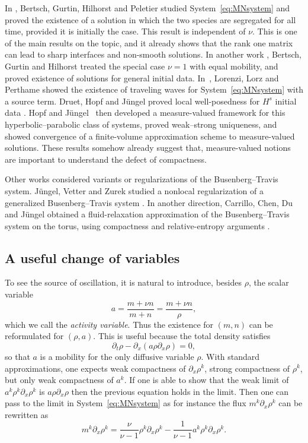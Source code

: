 \documentclass[a4paper,twosided,11pt]{article}
\newcommand{\1}{\mathbf{1}}
\theoremstyle{plain}
\theoremstyle{remark}
\numberwithin{equation}{section}
\begin{document}
In \cite{MR821681}, Bertsch, Gurtin, Hilhorst and Peletier studied System~\eqref{eq:MNsystem} and proved the existence of a solution in which the two species are segregated for all time, provided it is initially the case. This result is independent of $\nu$. This is one of the main results on the topic, and it already shows that the rank one matrix can lead to sharp interfaces and non-smooth solutions. In another work \cite{MR887658}, Bertsch, Gurtin and Hilhorst treated the special case $\nu=1$ with equal mobility, and proved existence of solutions for general initial data. In~\cite{lorenzi_interfaces_2016}, Lorenzi, Lorz and Perthame showed the existence of traveling waves for System~\eqref{eq:MNsystem} with a source term. Druet, Hopf and Jüngel proved local well-posedness for $H^s$ initial data \cite{DruetHopfJungel2023}. Hopf and Jüngel~\cite{HopfJungel2025} then developed a measure-valued framework for this hyperbolic--parabolic class of systems, proved weak--strong uniqueness, and showed convergence of a finite-volume approximation scheme to measure-valued solutions. These results somehow already suggest that, measure-valued notions are important to understand the defect of compactness.

Other works considered variants or regularizations of the Busenberg--Travis system. Jüngel, Vetter and Zurek studied a nonlocal regularization of a generalized Busenberg--Travis system \cite{2024arXiv240701123J}. In another direction, Carrillo, Chen, Du and Jüngel obtained a fluid-relaxation approximation of the Busenberg--Travis system on the torus, using compactness and relative-entropy arguments \cite{CarrilloChenDuJungel2025}. 


\subsection{A useful change of variables}

To see the source of oscillation, it is natural to introduce, besides $\rho$, the scalar variable
$$
a=\frac{m+\nu n}{m+n}=\frac{m+\nu n}{\rho},
$$
which we call the \emph{activity variable}. Thus the existence for $(m,n)$ can be reformulated for $(\rho,a)$. This is useful because the total density satisfies
$$
\partial_t\rho-\partial_x \left(a\rho \partial_x\rho\right)=0,
$$
so that $a$ is a mobility for the only diffusive variable $\rho$. With standard approximations, one expects weak compactness of $\partial_x \rho^k$, strong compactness of $\rho^k$, but only weak compactness of $a^k$. If one is able to show that the weak limit of $a^k \rho^k\partial_x \rho^k$ is $a \rho \partial_x \rho$ then the previous equation holds in the limit.  Then one can pass to the limit in System~\eqref{eq:MNsystem} as for instance the flux $m^k\partial_x\rho^k$ can be rewritten as 
$$
m^k\partial_x\rho^k = \frac{\nu}{\nu-1}\rho^k\partial_x\rho^k - \frac{1}{\nu-1}a^k\rho^k\partial_x\rho^k.
$$
\end{document}

